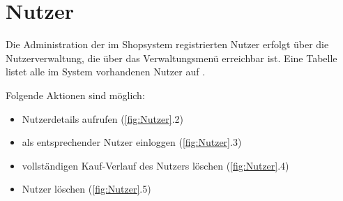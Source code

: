 \section{Nutzer}
\label{chp:Nutzer}
Die Administration der im Shopsystem registrierten Nutzer erfolgt über die Nutzerverwaltung, die über das Verwaltungsmenü erreichbar ist. Eine Tabelle listet alle im System vorhandenen Nutzer auf .

Folgende Aktionen sind möglich:
\begin{itemize}
  \item Nutzerdetails aufrufen (\ref{fig:Nutzer}.2) 
  \vspace*{-0.5em}
  \item als entsprechender Nutzer einloggen (\ref{fig:Nutzer}.3)
  \vspace*{-0.5em}
  \item vollständigen Kauf-Verlauf des Nutzers löschen (\ref{fig:Nutzer}.4)
  \vspace*{-0.5em}
  \item Nutzer löschen (\ref{fig:Nutzer}.5)
\end{itemize}


